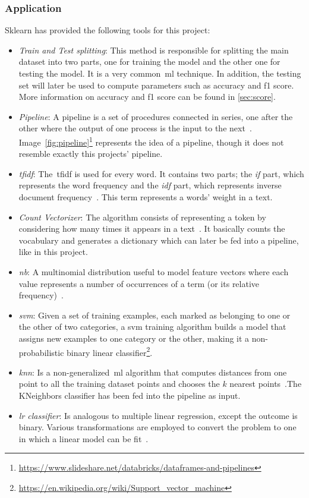 \subsubsection{Application}
Sklearn has provided the following tools for this project:
\begin{itemize}
	\item \textit{Train and Test splitting}: This method is responsible for splitting the main dataset into two parts, one for training the model and the other one for testing the model. It is a very common~\ac{ml} technique. In addition, the testing set will later be used to compute parameters such as accuracy and f1 score. More information on accuracy and f1 score can be found in \cref{sec:score}.
	\item \textit{Pipeline}: A pipeline is a set of procedures connected in series, one after the other where the output of one process is the input to the next~\cite{pipeline1}. Image~\ref{fig:pipeline}\footnote{\url{https://www.slideshare.net/databricks/dataframes-and-pipelines}} represents the idea of a pipeline, though it does not resemble exactly this projects' pipeline.
	\item \textit{\acl{tfidf}}: The~\acf{tfidf} is used for every word. It contains two parts; the \textit{if} part, which represents the word frequency and the \textit{idf} part, which represents inverse document frequency~\cite{tfidf1}. This term represents a words' weight in a text.
	\item \textit{Count Vectorizer}: The algorithm consists of representing a token by considering how many times it appears in a text~\cite{countvect1}. It basically counts the vocabulary and generates a dictionary which can later be fed into a pipeline, like in this project.
	\item \textit{\acl{nb}}: A multinomial distribution useful to model feature vectors where each value represents a number of occurrences of a term (or its relative frequency)~\cite{countvect1}.
	\item \textit{\acl{svm}}: Given a set of training examples, each marked as belonging to one or the other of two categories, a \acf{svm} training algorithm builds a model that assigns new examples to one category or the other, making it a non-probabilistic binary linear classifier\footnote{\url{https://en.wikipedia.org/wiki/Support_vector_machine}}.
	\item \textit{\acl{knn}}: Is a non-generalized~\ac{ml} algorithm that computes distances from one point to all the training dataset points and chooses the $k$ nearest points~\cite{knn1}.The KNeighbors classifier has been fed into the pipeline as input.
	\item \textit{\acl{lr} classifier}: Is analogous to multiple linear regression, except the outcome is binary. Various transformations are employed to convert the problem to one in which a linear model can be fit~\cite{lr1}.
\end{itemize}


